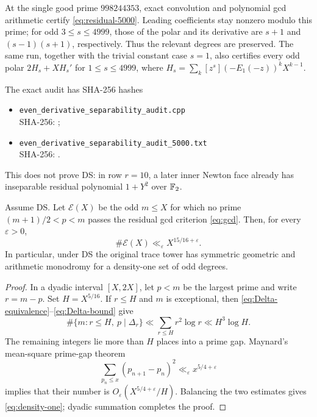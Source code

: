 At the single good prime $998244353$, exact convolution and polynomial gcd
arithmetic certify \eqref{eq:residual-5000}. Leading coefficients stay
nonzero modulo this prime; for odd $3\le s\le4999$, those of the polar and
its derivative are $s+1$ and $(s-1)(s+1)$, respectively. Thus the relevant
degrees are preserved. The same run, together with the trivial constant
case $s=1$, also certifies every odd polar $2H_s+XH_s'$ for
$1\le s\le4999$, where
$H_s=\sum_k[z^s](-E_1(-z))^kX^{k-1}$.

The exact audit has SHA-256 hashes
\begin{itemize}
\item \nolinkurl{even_derivative_separability_audit.cpp}\\[-.15em]
\textcolor{bluegray}{\small SHA-256: }
\texttt{\small{}};
\item \nolinkurl{even_derivative_separability_audit_5000.txt}\\[-.15em]
\textcolor{bluegray}{\small SHA-256: }
\texttt{\small{}}.
\end{itemize}
This does not prove DS: in row $r=10$, a later inner Newton face already
has inseparable residual polynomial $1+Y^2$ over $\mathbb F_2$.

\begin{theorem}\label{thm:density-one}
Assume DS. Let $\mathcal E(X)$ be the odd $m\le X$ for which no prime
$(m+1)/2<p<m$ passes the residual gcd criterion \eqref{eq:gcd}. Then, for
every $\varepsilon>0$,
\begin{equation}
\boxed{\#\mathcal E(X)\ll_\varepsilon X^{15/16+\varepsilon}.}
\label{eq:density-one}
\end{equation}
In particular, under DS the original trace tower has symmetric geometric
and arithmetic monodromy for a density-one set of odd degrees.
\end{theorem}

\begin{proof}
In a dyadic interval $[X,2X]$, let $p<m$ be the largest prime and write
$r=m-p$. Set $H=X^{5/16}$. If $r\le H$ and $m$ is exceptional, then
\eqref{eq:Delta-equivalence}--\eqref{eq:Delta-bound} give
\[
\#\{m:r\le H,\ p\mid\Delta_r\}
\ll\sum_{r\le H}r^2\log r
\ll H^3\log H.
\]
The remaining integers lie more than $H$ places into a prime gap. Maynard's
mean-square prime-gap theorem \cite[Theorem~3.1]{Maynard2012}
\[
\sum_{p_n\le x}(p_{n+1}-p_n)^2
\ll_\varepsilon x^{5/4+\varepsilon}
\]
implies that their number is
$O_\varepsilon(X^{5/4+\varepsilon}/H)$. Balancing the two estimates gives
\eqref{eq:density-one}; dyadic summation completes the proof.
\end{proof}

